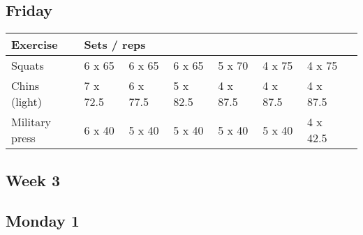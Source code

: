 \documentclass[12pt, a4paper]{article}%
\begin{document}
  \subsection*{\hspace{0.5em} Friday }


  \begin{tabular}{l|lllllll}
  \hspace{0.75em} \textbf{Exercise} & \multicolumn{ 7 }{l}{ \textbf{Sets / reps} } \\ \hline

            \hspace{0.75em} Squats
            & 6 x 65
            & 6 x 65
            & 6 x 65
            & 5 x 70
            & 4 x 75
            & 4 x 75
            & 
            \\


            \hspace{0.75em} Chins (light)
            & 7 x 72.5
            & 6 x 77.5
            & 5 x 82.5
            & 4 x 87.5
            & 4 x 87.5
            & 4 x 87.5
            & 
            \\


            \hspace{0.75em} Military press
            & 6 x 40
            & 5 x 40
            & 5 x 40
            & 5 x 40
            & 5 x 40
            & 4 x 42.5
            & 
            \\


  \end{tabular}


\clearpage \subsection*{\hspace{0.25em} Week 3 }
  \subsection*{\hspace{0.5em} Monday 1 }
\end{document}
